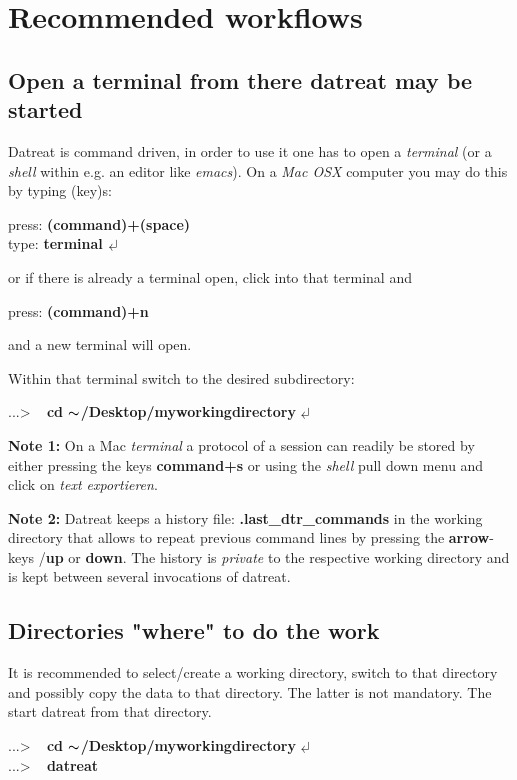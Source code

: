 \documentclass[11pt,fleqn]{book} %
\newcommand{\linespace}{\vspace{4ex}}
\newcommand{\return}{$\carriagereturn$} %
\newcommand{\sysprompt}{{\color{green}...\textgreater} ~ }
\newcommand{\home}{${\thicksim}$/Desktop}
\newcommand{\enter}[1]{{\color{red} \bf #1}}
\newcommand{\desc}[1]{\hskip 0.5cm {\color{descgray} #1}}
\begin{document}
\chapter{Recommended workflows}

\section{Open a terminal \desc{from there datreat may be started}}
Datreat is command driven, in order to use it one has to open a \emph{terminal} (or a
\emph{shell} within e.g. an editor like \emph{emacs}).
On a \emph{Mac OSX} computer you may do this by typing (key)s: 
\begin{corollary}
press: {\bf (command)+(space)} \\
type: {\bf terminal \return}
\end{corollary}
or if there is already a terminal open, click into that terminal and
\begin{corollary}
press: {\bf (command)+n} 
\end{corollary}
and a new terminal will open.

Within that terminal switch to the desired subdirectory:
\begin{corollary}
\sysprompt {\bf cd \home/myworkingdirectory} \return 
\end{corollary}

\linespace
{\bf Note 1:} On a Mac \emph{terminal} a protocol of a session can readily be stored by either
pressing the keys {\bf command+s} or using the \emph{shell} pull down menu and click on
\emph{text exportieren}.

\linespace
{\bf Note 2:} Datreat keeps a history file: {\bf .last\_dtr\_commands} in the working directory that allows
to repeat previous command lines by pressing the {\bf arrow}-keys /{\bf up} or {\bf down}.
The history is \emph{private} to the respective working directory and is kept between several
invocations of datreat.

\section{Directories  \desc{"where" to do the work}}
It is recommended to select/create a working directory, switch to that directory
and possibly copy the data to that directory. The latter is not mandatory.
The start datreat from that directory. 
\begin{corollary}
\sysprompt {\bf cd \home/myworkingdirectory} \return \\ 
\sysprompt {\bf datreat}
\end{corollary}
\end{document}
